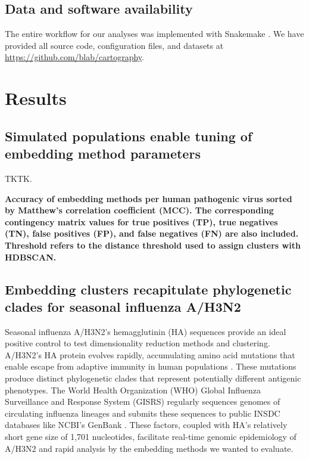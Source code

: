 \documentclass[10pt,letterpaper]{article}
\begin{document}
\subsection*{Data and software availability}

The entire workflow for our analyses was implemented with Snakemake \cite{molder_2021}.
We have provided all source code, configuration files, and datasets at \href{https://github.com/blab/cartography}{https://github.com/blab/cartography}.

\section*{Results}

\subsection*{Simulated populations enable tuning of embedding method parameters}

TKTK.

\begin{table}[!ht]
\begin{adjustwidth}{-2.25in}{0in} %
\centering
\caption{
{\bf Accuracy of embedding methods per human pathogenic virus sorted by Matthew's correlation coefficient (MCC). The corresponding contingency matrix values for true positives (TP), true negatives (TN), false positives (FP), and false negatives (FN) are also included. Threshold refers to the distance threshold used to assign clusters with HDBSCAN.}}

\label{table:accuracy}
\end{adjustwidth}
\end{table}

\subsection*{Embedding clusters recapitulate phylogenetic clades for seasonal influenza A/H3N2}

Seasonal influenza A/H3N2's hemagglutinin (HA) sequences provide an ideal positive control to test dimensionality reduction methods and clustering.
A/H3N2's HA protein evolves rapidly, accumulating amino acid mutations that enable escape from adaptive immunity in human populations \cite{flu-review}.
These mutations produce distinct phylogenetic clades that represent potentially different antigenic phenotypes.
The World Health Organization (WHO) Global Influenza Surveillance and Response System (GISRS) regularly sequences genomes of circulating influenza lineages \cite{who-gisrs} and submits these sequences to public INSDC databases like NCBI's GenBank \cite{insdc}.
These factors, coupled with HA's relatively short gene size of 1,701 nucleotides, facilitate real-time genomic epidemiology of A/H3N2 \cite{nextflu,nextstrain} and rapid analysis by the embedding methods we wanted to evaluate.
\end{document}
